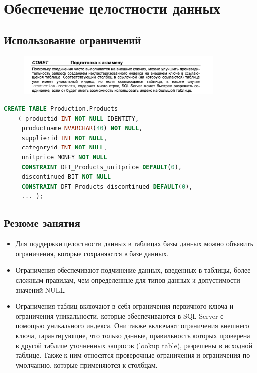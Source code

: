 \section{Обеспечение целостности данных}



\subsection{Использование ограничений}


\begin{figure}[h!]
	\begin{center}
		\includegraphics[width=0.9\textwidth]{img/advice15.png}
	\end{center}
	\captionsetup{justification=centering}
\end{figure}

\begin{lstlisting}[label=lst:funcReturn, language=sql]
	CREATE TABLE Production.Products
	( productid INT NOT NULL IDENTITY,
	 productname NVARCHAR(40) NOT NULL,
	 supplierid INT NOT NULL,
	 categoryid INT NOT NULL,
	 unitprice MONEY NOT NULL
	 CONSTRAINT DFT_Products_unitprice DEFAULT(0),
	 discontinued BIT NOT NULL
	 CONSTRAINT DFT_Products_discontinued DEFAULT(0),
	 ... );  
\end{lstlisting}	



		
\subsection*{Резюме занятия}
\begin{itemize}
	\item Для поддержки целостности данных в таблицах базы данных можно объявить
	ограничения, которые сохраняются в базе данных. 
	\item Ограничения обеспечивают подчинение данных, введенных в таблицы, более
	сложным правилам, чем определенные для типов данных и допустимости значений NULL. 
	\item Ограничения таблиц включают в себя ограничения первичного ключа и ограничения уникальности, которые обеспечиваются в SQL Server с помощью уникального индекса. Они также включают ограничения внешнего ключа, гарантирующие, что только данные, правильность которых проверена в другой таблице
	уточненных запросов (lookup table), разрешены в исходной таблице. Также
	к ним относятся проверочные ограничения и ограничения по умолчанию, которые применяются к столбцам. 
\end{itemize}


